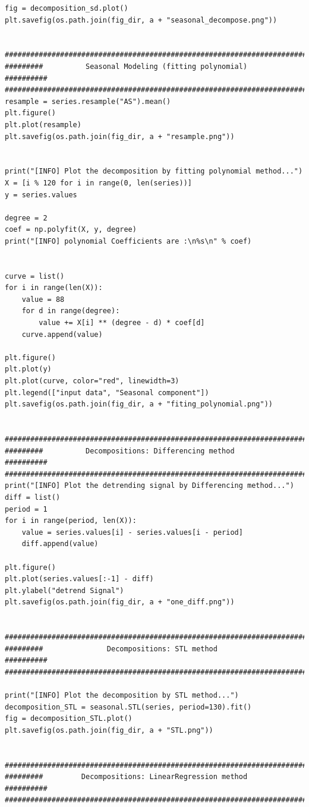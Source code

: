 \documentclass[12pt]{article}
\begin{document}
\begin{lstlisting}
fig = decomposition_sd.plot()
plt.savefig(os.path.join(fig_dir, a + "seasonal_decompose.png"))


############################################################################
#########          Seasonal Modeling (fitting polynomial)         ##########
############################################################################
resample = series.resample("AS").mean()
plt.figure()
plt.plot(resample)
plt.savefig(os.path.join(fig_dir, a + "resample.png"))


print("[INFO] Plot the decomposition by fitting polynomial method...")
X = [i % 120 for i in range(0, len(series))]
y = series.values

degree = 2
coef = np.polyfit(X, y, degree)
print("[INFO] polynomial Coefficients are :\n%s\n" % coef)


curve = list()
for i in range(len(X)):
    value = 88
    for d in range(degree):
        value += X[i] ** (degree - d) * coef[d]
    curve.append(value)

plt.figure()
plt.plot(y)
plt.plot(curve, color="red", linewidth=3)
plt.legend(["input data", "Seasonal component"])
plt.savefig(os.path.join(fig_dir, a + "fiting_polynomial.png"))


############################################################################
#########          Decompositions: Differencing method            ##########
############################################################################
print("[INFO] Plot the detrending signal by Differencing method...")
diff = list()
period = 1
for i in range(period, len(X)):
    value = series.values[i] - series.values[i - period]
    diff.append(value)

plt.figure()
plt.plot(series.values[:-1] - diff)
plt.ylabel("detrend Signal")
plt.savefig(os.path.join(fig_dir, a + "one_diff.png"))


############################################################################
#########               Decompositions: STL method                ##########
############################################################################

print("[INFO] Plot the decomposition by STL method...")
decomposition_STL = seasonal.STL(series, period=130).fit()
fig = decomposition_STL.plot()
plt.savefig(os.path.join(fig_dir, a + "STL.png"))


############################################################################
#########         Decompositions: LinearRegression method         ##########
############################################################################


\end{lstlisting}
\end{document}
